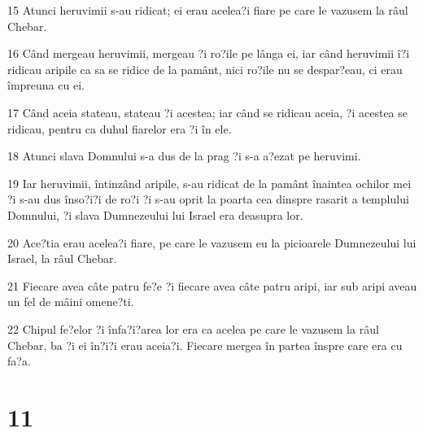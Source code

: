 \par 15 Atunci heruvimii s-au ridicat; ei erau acelea?i fiare pe care le vazusem la râul Chebar.
\par 16 Când mergeau heruvimii, mergeau ?i ro?ile pe lânga ei, iar când heruvimii î?i ridicau aripile ca sa se ridice de la pamânt, nici ro?ile nu se despar?eau, ci erau împreuna cu ei.
\par 17 Când aceia stateau, stateau ?i acestea; iar când se ridicau aceia, ?i acestea se ridicau, pentru ca duhul fiarelor era ?i în ele.
\par 18 Atunci slava Domnului s-a dus de la prag ?i s-a a?ezat pe heruvimi.
\par 19 Iar heruvimii, întinzând aripile, s-au ridicat de la pamânt înaintea ochilor mei ?i s-au dus înso?i?i de ro?i ?i s-au oprit la poarta cea dinspre rasarit a templului Domnului, ?i slava Dumnezeului lui Israel era deasupra lor.
\par 20 Ace?tia erau acelea?i fiare, pe care le vazusem eu la picioarele Dumnezeului lui Israel, la râul Chebar.
\par 21 Fiecare avea câte patru fe?e ?i fiecare avea câte patru aripi, iar sub aripi aveau un fel de mâini omene?ti.
\par 22 Chipul fe?elor ?i înfa?i?area lor era ca acelea pe care le vazusem la râul Chebar, ba ?i ei în?i?i erau aceia?i. Fiecare mergea în partea înspre care era cu fa?a.

\chapter{11}

